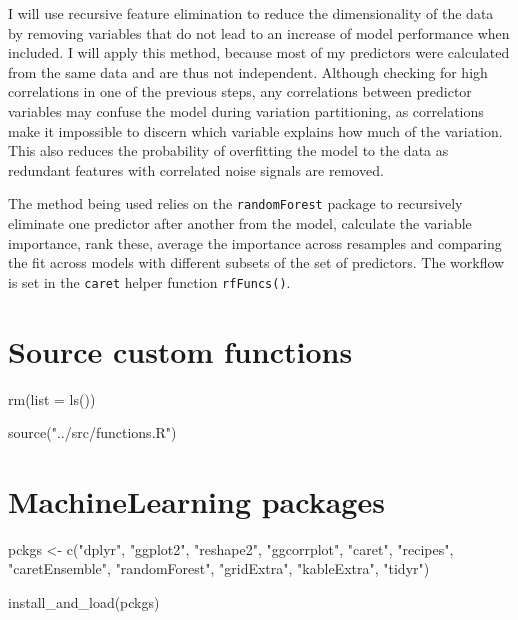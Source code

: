 \documentclass[
  letterpaper,
  DIV=11,
  numbers=noendperiod]{scrreprt}
\newenvironment{Shaded}{\begin{snugshade}}{\end{snugshade}}
\newcommand{\AttributeTok}[1]{\textcolor[rgb]{0.40,0.45,0.13}{#1}}
\newcommand{\FunctionTok}[1]{\textcolor[rgb]{0.28,0.35,0.67}{#1}}
\newcommand{\NormalTok}[1]{\textcolor[rgb]{0.00,0.23,0.31}{#1}}
\newcommand{\OtherTok}[1]{\textcolor[rgb]{0.00,0.23,0.31}{#1}}
\newcommand{\StringTok}[1]{\textcolor[rgb]{0.13,0.47,0.30}{#1}}
\begin{document}
I will use recursive feature elimination to reduce the dimensionality of
the data by removing variables that do not lead to an increase of model
performance when included. I will apply this method, because most of my
predictors were calculated from the same data and are thus not
independent. Although checking for high correlations in one of the
previous steps, any correlations between predictor variables may confuse
the model during variation partitioning, as correlations make it
impossible to discern which variable explains how much of the variation.
This also reduces the probability of overfitting the model to the data
as redundant features with correlated noise signals are removed.

The method being used relies on the \texttt{randomForest} package to
recursively eliminate one predictor after another from the model,
calculate the variable importance, rank these, average the importance
across resamples and comparing the fit across models with different
subsets of the set of predictors. The workflow is set in the
\texttt{caret} helper function \texttt{rfFuncs()}.

\section{Source custom functions}

\begin{Shaded}
\begin{Highlighting}[]
\FunctionTok{rm}\NormalTok{(}\AttributeTok{list =} \FunctionTok{ls}\NormalTok{())}

\FunctionTok{source}\NormalTok{(}\StringTok{"../src/functions.R"}\NormalTok{)}
\end{Highlighting}
\end{Shaded}

\section{MachineLearning packages}

\begin{Shaded}
\begin{Highlighting}[]
\NormalTok{pckgs }\OtherTok{\textless{}{-}} \FunctionTok{c}\NormalTok{(}\StringTok{"dplyr"}\NormalTok{, }\StringTok{"ggplot2"}\NormalTok{, }\StringTok{"reshape2"}\NormalTok{, }
           \StringTok{"ggcorrplot"}\NormalTok{, }
           \StringTok{"caret"}\NormalTok{,  }\StringTok{"recipes"}\NormalTok{,   }\StringTok{"caretEnsemble"}\NormalTok{, }
           \StringTok{"randomForest"}\NormalTok{, }
           \StringTok{"gridExtra"}\NormalTok{, }\StringTok{"kableExtra"}\NormalTok{, }\StringTok{"tidyr"}\NormalTok{)}

\FunctionTok{install\_and\_load}\NormalTok{(pckgs)}
\end{Highlighting}
\end{Shaded}
\end{document}
